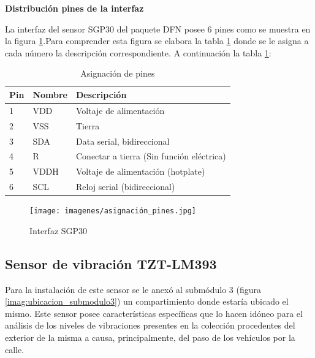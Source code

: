 \textbf{Distribución pines de la interfaz}

La interfaz del sensor SGP30 del paquete DFN posee 6 pines como se muestra en la figura \ref{imag:interfaz_sgp30}.Para comprender esta figura se elabora la tabla \ref{tab:asignacion_pines} donde se le asigna a cada número la descripción correspondiente. A continuación la tabla \ref{tab:asignacion_pines}:

\begin{table}[H]
    \centering
    \caption{Asignación de pines}
    \label{tab:asignacion_pines}
    \begin{tabular}{|l|l|l|}
    \hline
    \rowcolor[HTML]{9698ED} 
    Pin & Nombre & Descripción                               \\ \hline
    1   & VDD    & Voltaje de alimentación                   \\ \hline
    2   & VSS    & Tierra                                    \\ \hline
    3   & SDA    & Data serial, bidireccional                \\ \hline
    4   & R      & Conectar a tierra (Sin función eléctrica) \\ \hline
    5   & VDDH   & Voltaje de alimentación (hotplate)        \\ \hline
    6   & SCL    & Reloj serial (bidireccional)              \\ \hline
    \end{tabular}
\end{table}

\begin{figure}[H]
    \centering
    \texttt{[image: imagenes/asignación\_pines.jpg]}
    \caption{Interfaz SGP30}
    \label{imag:interfaz_sgp30}
 \end{figure}

\subsection{Sensor de vibración TZT-LM393}

Para la instalación de este sensor se le anexó al submódulo 3 (figura \ref{imag:ubicacion_submodulo3}) un compartimiento donde estaría ubicado el mismo.
Este sensor posee características específicas que lo hacen idóneo para el análisis de los niveles de vibraciones presentes en la colección procedentes del exterior de la misma a causa, principalmente, del paso de los vehículos por la calle.\\

